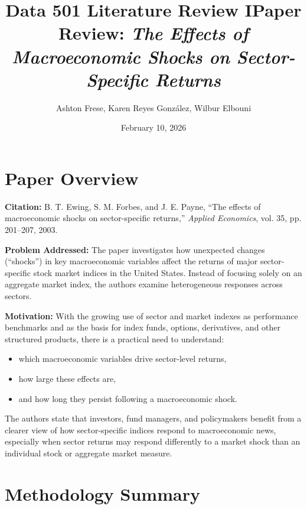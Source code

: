 \documentclass{article}
\title{Data 501 Literature Review I}
\author{Ashton Frese, Karen Reyes González, Wilbur Elbouni}
\date{February 10, 2026}
\begin{document}
\maketitle 

\title{Paper Review: \textit{The Effects of Macroeconomic Shocks on Sector-Specific Returns}}

\section{Paper Overview}

\noindent \textbf{Citation:}  
B. T. Ewing, S. M. Forbes, and J. E. Payne, ``The effects of macroeconomic shocks on sector-specific returns,'' \textit{Applied Economics}, vol. 35, pp. 201--207, 2003.

\vspace{0.5em}

\noindent \textbf{Problem Addressed:}  
The paper investigates how unexpected changes (``shocks'') in key macroeconomic variables affect the returns of major sector-specific stock market indices in the United States. Instead of focusing solely on an aggregate market index, the authors examine heterogeneous responses across sectors.

\vspace{0.5em}

\noindent \textbf{Motivation:}  
With the growing use of sector and market indexes as performance benchmarks and as the basis for index funds, options, derivatives, and other structured products, there is a practical need to understand:

\begin{itemize}
    \item which macroeconomic variables drive sector-level returns,
    \item how large these effects are,
    \item and how long they persist following a macroeconomic shock.
\end{itemize}

\noindent The authors state that investors, fund managers, and policymakers benefit from a clearer view of how sector-specific indices respond to macroeconomic news, especially when sector returns may respond differently to a market shock than an individual stock or aggregate market measure.

\section{Methodology Summary}
\end{document}
